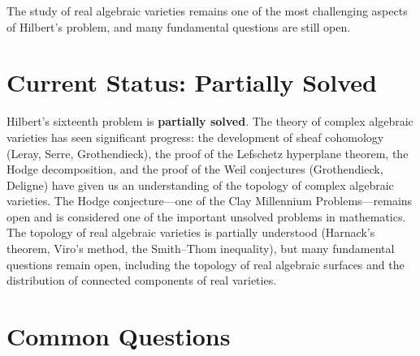 The study of real algebraic varieties remains one of the most challenging aspects of Hilbert's problem, and many fundamental questions are still open.

\section{Current Status: Partially Solved}

\begin{partiallybox}
Hilbert's sixteenth problem is \textbf{partially solved}. The theory of complex algebraic varieties has seen significant progress: the development of sheaf cohomology (Leray, Serre, Grothendieck), the proof of the Lefschetz hyperplane theorem, the Hodge decomposition, and the proof of the Weil conjectures (Grothendieck, Deligne) have given us an understanding of the topology of complex algebraic varieties. The Hodge conjecture---one of the Clay Millennium Problems---remains open and is considered one of the important unsolved problems in mathematics. The topology of real algebraic varieties is partially understood (Harnack's theorem, Viro's method, the Smith--Thom inequality), but many fundamental questions remain open, including the topology of real algebraic surfaces and the distribution of connected components of real varieties.
\end{partiallybox}

\section*{Common Questions}

